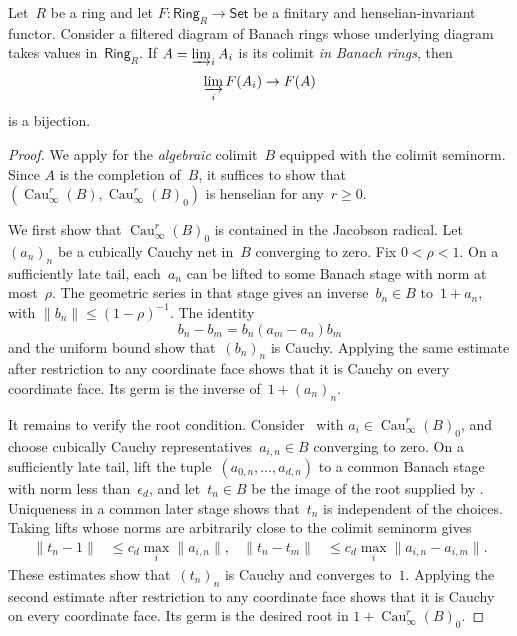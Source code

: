 \documentclass[11pt,a4paper]{amsart}
\renewcommand{\injlim}{\varinjlim}
\newcommand{\cref}[1]{\zcref{#1}}
\numberwithin{equation}{section}
\theoremstyle{plain}
\theoremstyle{definition}
\theoremstyle{remark}
\newcommand{\Cau}{\operatorname{Cau}}
\newcommand{\Cat}[1]{\mathsf{#1}}
\begin{document}
\begin{theorem}\label{banach}
  Let~\(R\) be a ring and let
  \(F\colon\Cat{Ring}_R\to\Cat{Set}\)
  be a finitary and henselian-invariant functor.
  Consider a filtered diagram of Banach rings whose
  underlying diagram takes values in~\(\Cat{Ring}_R\).
  If \(A=\injlim_i A_i\) is its colimit \emph{in Banach rings},
  then
  \begin{equation*}
    \injlim_{i}F(A_{i})\to F(A)
  \end{equation*}
  is a bijection.
\end{theorem}

\begin{proof}
  We apply \cref{gabber}
  for the \emph{algebraic} colimit~\(B\)
  equipped with the colimit seminorm.
  Since \(A\) is the completion of~\(B\),
  it suffices to show that
  \((\Cau^{r}_{\infty}(B),\Cau^{r}_{\infty}(B)_{0})\)
  is henselian for any~\(r\geq0\).

  We first show that
  \(\Cau^{r}_{\infty}(B)_{0}\) is contained in the Jacobson radical.
  Let~\((a_n)_n\) be a cubically Cauchy net in~\(B\) converging to zero.
  Fix \(0<\rho<1\). On a sufficiently late tail,
  each~\(a_n\) can be lifted to some Banach stage with norm at most~\(\rho\).
  The geometric series in that stage gives an inverse~\(b_n\in B\)
  to~\(1+a_n\), with \(\lVert b_n\rVert\leq(1-\rho)^{-1}\).
  The identity
  \begin{equation*}
    b_n-b_m=b_n(a_m-a_n)b_m
  \end{equation*}
  and the uniform bound show that~\((b_n)_n\) is Cauchy.
  Applying the same estimate after restriction to any coordinate face
  shows that it is Cauchy on every coordinate face.
  Its germ is the inverse of~\(1+(a_n)_n\).

  It remains to verify the root condition.
  Consider~\cref{e:hensel} with
  \(a_{i}\in\Cau^{r}_{\infty}(B)_{0}\),
  and choose cubically Cauchy representatives~\(a_{i,n}\in B\)
  converging to zero.
  On a sufficiently late tail,
  lift the tuple~\((a_{0,n},\dotsc,a_{d,n})\)
  to a common Banach stage with norm less than~\(\epsilon_d\),
  and let~\(t_n\in B\) be the image of the root supplied by
  \cref{hensel}.
  Uniqueness in a common later stage shows that~\(t_n\)
  is independent of the choices.
  Taking lifts whose norms are arbitrarily close to the colimit
  seminorm gives
  \begin{align*}
    \lVert t_n-1\rVert
    &\leq c_d\max_i\lVert a_{i,n}\rVert,&
    \lVert t_n-t_m\rVert
    &\leq c_d\max_i\lVert a_{i,n}-a_{i,m}\rVert.
  \end{align*}
  These estimates show that~\((t_n)_n\) is Cauchy and converges
  to~\(1\). Applying the second estimate after restriction to
  any coordinate face shows that it is Cauchy on every coordinate face.
  Its germ is the desired root in
  \(1+\Cau^{r}_{\infty}(B)_{0}\).
\end{proof}
\end{document}
